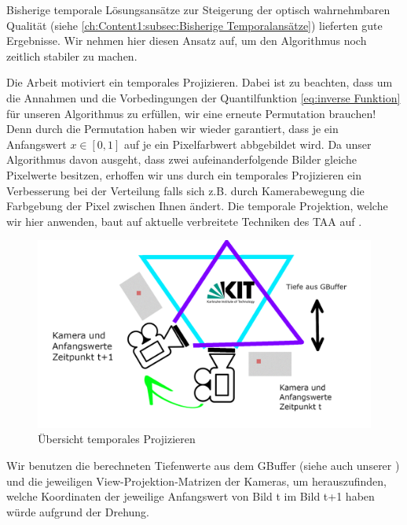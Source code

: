 Bisherige temporale Lösungsansätze zur Steigerung der optisch wahrnehmbaren Qualität (siehe \ref{ch:Content1:subsec:Bisherige Temporalansätze})
lieferten gute Ergebnisse. Wir nehmen hier diesen Ansatz auf, um den Algorithmus noch zeitlich stabiler zu machen.
\par

Die Arbeit \cite[S.9/10]{hal02158423} motiviert ein temporales Projizieren. Dabei ist zu beachten, dass um die  Annahmen und die Vorbedingungen der 
Quantilfunktion \ref{eq:inverse Funktion} für unseren Algorithmus zu erfüllen, wir eine erneute Permutation brauchen! Denn durch die Permutation haben wir wieder garantiert, 
dass je ein Anfangswert $x \in [0,1]$ auf je ein Pixelfarbwert abbgebildet wird. Da unser Algorithmus davon ausgeht, dass zwei aufeinanderfolgende Bilder gleiche Pixelwerte 
besitzen, erhoffen wir uns durch ein temporales Projizieren ein Verbesserung bei der  Verteilung falls sich z.B. durch Kamerabewegung die Farbgebung 
der Pixel zwischen Ihnen ändert. Die temporale Projektion, welche wir hier anwenden, baut auf aktuelle verbreitete Techniken des TAA auf \cite{INSIDETAA}.

\begin{figure}[H]
        \centering
        \includegraphics[width=\linewidth]{content/TemporalerAlg/Bilder/Reprojection/TemporalReprojectPrincipal.png}
        \caption{Übersicht temporales Projizieren}
        \label{pic:Uebersicht_Temporal_Reprojection}
\end{figure}

Wir benutzen die berechneten Tiefenwerte aus dem GBuffer (siehe auch unserer ) und die jeweiligen 
View-Projektion-Matrizen der Kameras, um herauszufinden, welche Koordinaten der jeweilige Anfangswert von Bild t im Bild t+1 
haben würde aufgrund der Drehung.
\par 

